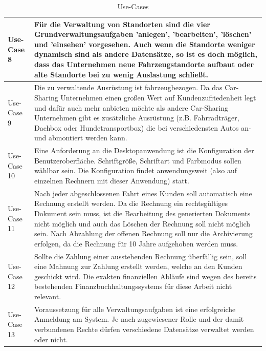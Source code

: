 \begin{table}[ht]

    \begin{onehalfspace}

    \begin{tabular}{l | p{12.5cm}}
        \hline
        Use-Case 8 & Für die Verwaltung von Standorten sind die vier Grundverwaltungsaufgaben 'anlegen', 'bearbeiten', 'löschen' und 'einsehen' vorgesehen. Auch wenn die Standorte weniger dynamisch sind als andere Datensätze, so ist es doch möglich, dass das Unternehmen neue Fahrzeugstandorte aufbaut oder alte Standorte bei zu wenig Auslastung schließt. \\
        \hline
        Use-Case 9 & Die zu verwaltende Ausrüstung ist fahrzeugbezogen. Da das Car-Sharing Unternehmen einen großen Wert auf Kundenzufriedenheit legt und dafür auch mehr anbieten möchte als andere Car-Sharing Unternehmen gibt es zusätzliche Ausrüstung (z.B. Fahrradträger, Dachbox oder Hundetransportbox) die bei verschiedensten Autos an- und abmontiert werden kann. \\
        \hline
        Use-Case 10 & Eine Anforderung an die Desktopanwendung ist die Konfiguration der Benutzeroberfläche. Schriftgröße, Schriftart und Farbmodus sollen wählbar sein. Die Konfiguration findet anwendungsweit (also auf einzelnen Rechnern mit dieser Anwendung) statt.\\
        \hline
        Use-Case 11 & Nach jeder abgeschlossenen Fahrt eines Kunden soll automatisch eine Rechnung erstellt werden. Da die Rechnung ein rechtsgültiges Dokument sein muss, ist die Bearbeitung des generierten Dokuments nicht möglich und auch das Löschen der Rechnung soll nicht möglich sein. Nach Abzahlung der offenen Rechnung soll nur die Archivierung erfolgen, da die Rechnung für 10 Jahre aufgehoben werden muss.\\ 
        \hline
        Use-Case 12 & Sollte die Zahlung einer ausstehenden Rechnung überfällig sein, soll eine Mahnung zur Zahlung erstellt werden, welche an den Kunden geschickt wird. Die exakten finanziellen Abläufe sind wegen des bereits bestehenden Finanzbuchhaltungssystems für diese Arbeit nicht relevant. \\
        \hline
        Use-Case 13 & Voraussetzung für alle Verwaltungsaufgaben ist eine erfolgreiche Anmeldung am System. Je nach zugewiesener Rolle und der damit verbundenen Rechte dürfen verschiedene Datensätze verwaltet werden oder nicht.\\
        \hline

    \end{tabular}
    \caption{Use-Cases}
    \label{tbl:usecases3}

    \end{onehalfspace}
\end{table}

